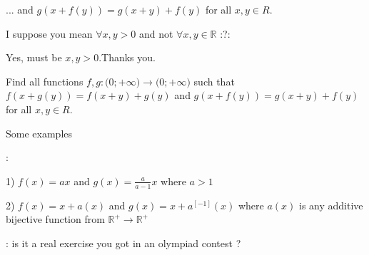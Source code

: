 \begin{solution}
	\begin{tcolorbox}... and $g(x+f(y))=g(x+y)+f(y)$ for all $x,y{\in}R$.\end{tcolorbox}
I suppose you mean $\forall x,y>0$ and not $\forall x,y\in\mathbb R$ :?:
\end{solution}



\begin{solution}
	Yes, must be  $x,y>0$.Thanks you.
\end{solution}



\begin{solution}
	\begin{tcolorbox}Find all functions ${{f,g: \mathbb(0;+\infty)}\to\mathbb(0;+\infty)}$ such that  $f(x+g(y))=f(x+y)+g(y)$ and $g(x+f(y))=g(x+y)+f(y)$ for all $x,y{\in}R$.\end{tcolorbox}
\begin{bolded}Some examples\end{bolded} :

1) $f(x)=ax$ and $g(x)=\frac a{a-1}x$ where $a>1$

2) $f(x)=x+a(x)$ and $g(x)=x+a^{[-1]}(x)$ where $a(x)$ is any additive bijective function from $\mathbb R^+\to\mathbb R^+$

: is it a real exercise you got in an olympiad contest ?
\end{solution}



